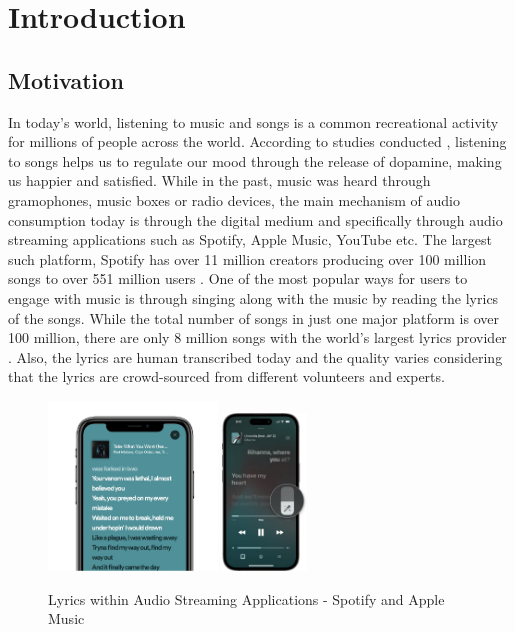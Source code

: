 
\chapter{Introduction}
\label{sec:thesisintroduction}

\section{Motivation}%
\label{sec:motivation}

In today’s world, listening to music and songs is a common recreational activity for millions of people across the world. According to studies conducted \cite{salimpoor2011anatomically}, listening to songs helps us to regulate our mood through the release of dopamine, making us happier and satisfied. While in the past, music was heard through gramophones, music boxes or radio devices, the main mechanism of audio consumption today is through the digital medium and specifically through audio streaming applications such as Spotify, Apple Music, YouTube etc. The largest such platform, Spotify has over 11 million creators producing over 100 million songs to over 551 million users \cite{Spotify_2023} . One of the most popular ways for users to engage with music is through singing along with the music by reading the lyrics of the songs. While the total number of songs in just one major platform is over 100 million, there are only 8 million songs with the world’s largest lyrics provider \cite{musixmatch_2023}. Also, the lyrics are human transcribed today and the quality varies considering that the lyrics are crowd-sourced from different volunteers and experts.

\begin{figure}
    \centering
    \includegraphics[width=0.4\textwidth]{01-introduction/figures/spotify_lyrics.pdf}
    \includegraphics[width=0.2\textwidth]{01-introduction/figures/applemusic_lyrics.pdf}
    \caption{Lyrics within Audio Streaming Applications - Spotify and Apple Music}%
    \label{fig:setup0}
\end{figure}

